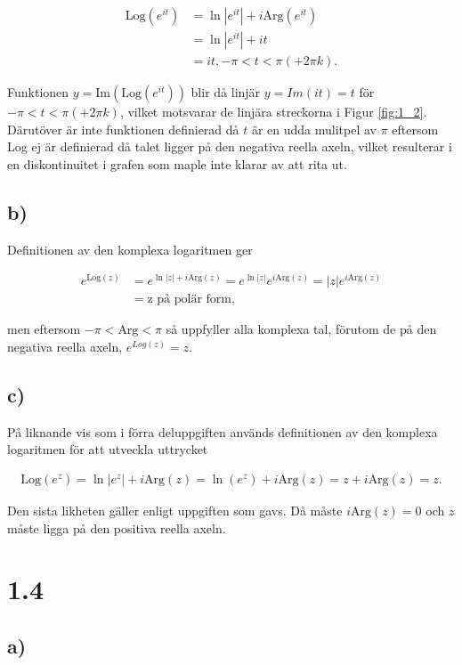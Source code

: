 \documentclass[a4paper]{article}
\begin{document}
\begin{align*}
	\text{Log}(e^{it})	&= \ln|e^{it}| + i\text{Arg}(e^{it})\\
						&= \ln|e^{it}| + it\\
						&= it, -\pi < t < \pi (+2\pi k).
\end{align*}

Funktionen $y = \text{Im}(\text{Log}(e^{it}))$ blir då linjär $y = Im(it) = t$ för $-\pi < t < \pi (+2\pi k)$, vilket motsvarar de linjära streckorna i Figur \ref{fig:1_2}. Därutöver är inte funktionen definierad då $t$ är en udda mulitpel av $\pi$ eftersom Log ej är definierad då talet ligger på den negativa reella axeln, vilket resulterar i en diskontinuitet i grafen som maple inte klarar av att rita ut.

\subsection*{b)}

Definitionen av den komplexa logaritmen ger

\begin{align*}
	e^{\text{Log}(z)}	&= e^{\ln|z| + i\text{Arg}(z)} = e^{\ln|z|}e^{i\text{Arg}(z)} = |z|e^{i\text{Arg}(z)}\\
						&= \text{z på polär form},
\end{align*}

men eftersom $-\pi < \text{Arg} < \pi$ så uppfyller alla komplexa tal, förutom de på den negativa reella axeln, $e^{Log(z)} = z$.

\subsection*{c)}

På liknande vis som i förra deluppgiften används definitionen av den komplexa logaritmen för att utveckla uttrycket

\begin{align*}
	\text{Log}(e^z) = \ln|e^z| + i\text{Arg}(z) = \ln(e^z) + i\text{Arg}(z) = z + i\text{Arg}(z) = z.
\end{align*}

Den sista likheten gäller enligt uppgiften som gavs. Då måste $i\text{Arg}(z) = 0$ och $z$ måste ligga på den positiva reella axeln.

\section*{1.4}
\subsection*{a)}
\end{document}
